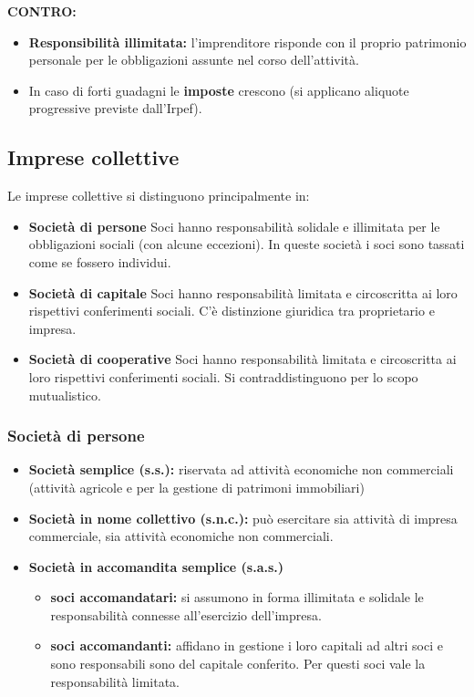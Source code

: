 \documentclass[../main.tex]{subfiles}
\begin{document}
\textbf{CONTRO:}
\begin{itemize}
\item \textbf{Responsibilità illimitata:} l'imprenditore risponde con il proprio patrimonio personale per le obbligazioni assunte nel corso dell'attività.

\item In caso di forti guadagni le \textbf{imposte} crescono (si applicano aliquote progressive previste dall'Irpef).

\end{itemize}

\subsection{Imprese collettive}

Le imprese collettive si distinguono principalmente in:

\begin{itemize}
\item \textbf{Società di persone}
Soci hanno responsabilità solidale e illimitata per le obbligazioni sociali (con alcune eccezioni). In queste società i soci sono tassati come se fossero individui.

\item \textbf{Società di capitale}
Soci hanno responsabilità limitata e circoscritta ai loro rispettivi conferimenti sociali.
C'è distinzione giuridica tra proprietario e impresa.

\item \textbf{Società di cooperative} Soci hanno responsabilità limitata e circoscritta ai loro rispettivi conferimenti sociali.
Si contraddistinguono per lo scopo mutualistico.
\end{itemize}

\subsubsection{Società di persone}

\begin{itemize}
\item \textbf{Società semplice (s.s.):} riservata ad attività economiche non commerciali (attività agricole e per la gestione di patrimoni immobiliari)
\item \textbf{Società in nome collettivo (s.n.c.):} può esercitare sia attività di impresa commerciale, sia attività economiche non commerciali.
\item \textbf{Società in accomandita semplice (s.a.s.)}
	\begin{itemize}
	\item \textbf{soci accomandatari:} si assumono in forma illimitata e solidale le responsabilità connesse all'esercizio dell'impresa.
	\item \textbf{soci accomandanti:} affidano in gestione i loro capitali ad altri soci e sono responsabili sono del capitale conferito. Per questi soci vale la responsabilità limitata.
	
	\end{itemize}
\end{itemize}
\end{document}
